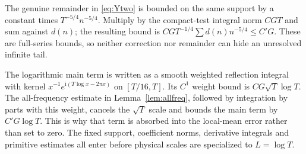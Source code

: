 \documentclass[11pt,a4paper]{article}
\numberwithin{equation}{section}
\theoremstyle{definition}
\newcommand{\ii}{\mathrm i}
\begin{document}
The genuine remainder in \eqref{eq:Ytwo} is bounded on the same support by a
constant times $T^{-5/4}n^{-5/4}$. Multiply by the compact-test integral norm
$CGT$ and sum against $d(n)$; the resulting bound is
$CGT^{-1/4}\sum d(n)n^{-5/4}\le C'G$. These are full-series bounds,
so neither correction nor remainder can hide an unresolved infinite tail.

The logarithmic main term is written as a smooth weighted reflection integral
with kernel $x^{-1}e^{\ii(T\log x-2\pi x)}$ on $[T/16,T]$.
Its $C^1$ weight bound is $CG\sqrt T\log T$. The all-frequency estimate in
Lemma~\ref{lem:allfreq}, followed by integration by parts with this weight,
cancels the $\sqrt T$ scale and bounds the main term by $C'G\log T$.
This is why that term is absorbed into the local-mean error rather than set to
zero. The fixed support, coefficient norms, derivative integrals and primitive
estimates all enter before physical scales are specialized to $L=\log T$.
\end{document}
